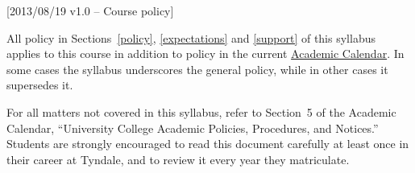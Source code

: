 [2013/08/19 v1.0 -- Course policy]

\newcommand{\AC}{Academic Calendar}
\newcommand{\SecAC}{Section~5 of the \AC}

All policy in Sections~\ref{policy}, \ref{expectations} and \ref{support} of
this syllabus applies to this course in addition to policy in the current
\href{http://www.tyndale.ca/registrar/calendar}{\AC}. In some cases the
syllabus underscores the general policy, while in other cases it supersedes it.

For all matters not covered in this syllabus, refer to \SecAC, ``University
College Academic Policies, Procedures, and Notices.'' Students are strongly
encouraged to read this document carefully at least once in their career at
Tyndale, and to review it every year they matriculate.
